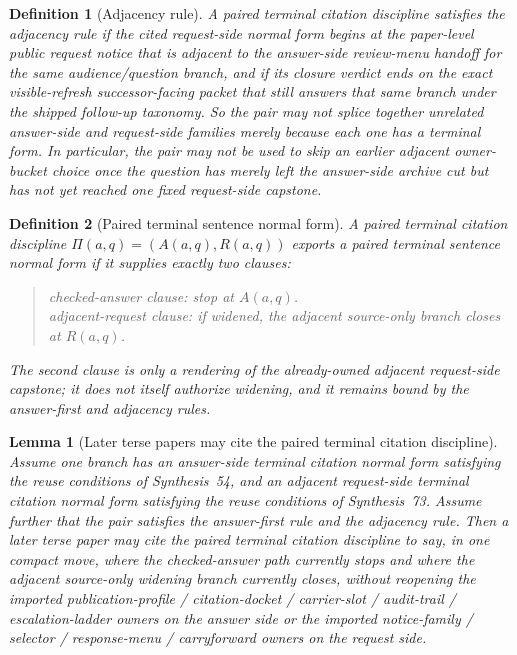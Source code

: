 \documentclass[11pt]{article}
\newtheorem{definition}{Definition}
\newtheorem{lemma}{Lemma}
\begin{document}
\begin{definition}[Adjacency rule]
A paired terminal citation discipline satisfies the \emph{adjacency rule} if the cited request-side normal form begins at the paper-level public request notice that is adjacent to the answer-side review-menu handoff for the same audience/question branch, and if its closure verdict ends on the exact visible-refresh successor-facing packet that still answers that same branch under the shipped follow-up taxonomy.
So the pair may not splice together unrelated answer-side and request-side families merely because each one has a terminal form. In particular, the pair may not be used to skip an earlier adjacent owner-bucket choice once the question has merely left the answer-side archive cut but has not yet reached one fixed request-side capstone.
\end{definition}

\begin{definition}[Paired terminal sentence normal form]
A paired terminal citation discipline \(\Pi(a,q)=(A(a,q),R(a,q))\) exports a \emph{paired terminal sentence normal form} if it supplies exactly two clauses:
\begin{quote}\small
checked-answer clause: stop at \(A(a,q)\).\\
adjacent-request clause: if widened, the adjacent source-only branch closes at \(R(a,q)\).
\end{quote}
The second clause is only a rendering of the already-owned adjacent request-side capstone; it does not itself authorize widening, and it remains bound by the answer-first and adjacency rules.
\end{definition}

\begin{lemma}[Later terse papers may cite the paired terminal citation discipline]
Assume one branch has an answer-side terminal citation normal form satisfying the reuse conditions of Synthesis~54, and an adjacent request-side terminal citation normal form satisfying the reuse conditions of Synthesis~73.
Assume further that the pair satisfies the answer-first rule and the adjacency rule.
Then a later terse paper may cite the paired terminal citation discipline to say, in one compact move, where the checked-answer path currently stops and where the adjacent source-only widening branch currently closes, without reopening the imported publication-profile / citation-docket / carrier-slot / audit-trail / escalation-ladder owners on the answer side or the imported notice-family / selector / response-menu / carryforward owners on the request side.
\end{lemma}
\end{document}
